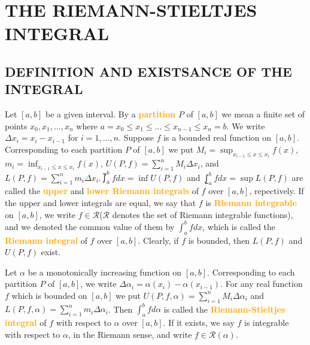 \section{THE RIEMANN-STIELTJES INTEGRAL}

\subsection{DEFINITION AND EXISTSANCE OF THE INTEGRAL}

\begin{definition}
Let $[a,b]$ be a given interval. By a \textbf{\textcolor{orange}{partition}} $P$ of $[a,b]$ we mean a finite set of points $x_0,x_1,\dots,x_n$ where $a=x_0\leq x_1\leq \dots \leq x_{n-1}\leq x_n=b$. We write $\Delta x_i=x_i-x_{i-1}$ for $i=1,\dots,n$. Suppose $f$ is a bounded real function on $[a,b]$. Corresponding to each partition $P$ of $[a,b]$ we put $\displaystyle M_i=\sup_{x_{i-1}\leq x\leq x_i}f(x)$, $\displaystyle m_i=\inf_{x_{i-1}\leq x\leq x_i}f(x)$, $\displaystyle U(P,f)=\sum_{i=1}^nM_i\Delta x_i$, and $\displaystyle L(P,f)=\sum_{i=1}^nm_i\Delta x_i$.$\displaystyle \upint_a^bfdx=\inf U(P,f)$ and $\displaystyle \lowint_a^bfdx=\sup L(P,f)$ are called the \textbf{\textcolor{orange}{upper}} and \textbf{\textcolor{orange}{lower Riemann integrals}} of $f$ over $[a,b]$, repectively. If the upper and lower integrals are equal, we say that $f$ is \textbf{\textcolor{orange}{Riemann integrable}} on $[a,b]$, we write $f\in \mathscr{R}$($\mathscr{R}$ denotes the set of Riemann integrable functions), and we denoted the common value of them by $\displaystyle \int_a^bfdx$, which is called the \textbf{\textcolor{orange}{Riemann integral}} of $f$ over $[a,b]$. Clearly, if $f$ is bounded, then $L(P,f)$ and $U(P,f)$ exist.
\end{definition}

\begin{definition}
Let $\alpha$ be a monotonically increasing function on $[a,b]$. Corresponding to each partition $P$ of $[a,b]$, we write $\Delta \alpha_i=\alpha(x_i)-\alpha(x_{i-1})$. For any real function $f$ which is bounded on $[a,b]$ we put $\displaystyle U(P,f,\alpha)=\sum_{i=1}^nM_i\Delta\alpha_i$ and $\displaystyle L(P,f,\alpha)=\sum_{i=1}^nm_i\Delta\alpha_i$. Then $\displaystyle \int_a^bfd\alpha$ is called the \textbf{\textcolor{orange}{Riemann-Stieltjes integral}} of $f$ with respect to $\alpha$ over $[a,b]$. If it exists, we say $f$ is integrable with respect to $\alpha$, in the Riemann sense, and write $f\in \mathscr{R}(\alpha)$.
\end{definition}

